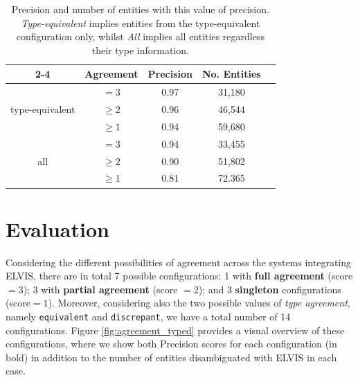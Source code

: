 \begin{table}[ht!]
\centering
\def\arraystretch{1.2}
	\begin{tabular}{| c | c | c | c | c |}
\cline{2-4}
\multicolumn{1}{ c |  }{} & \textbf{Agreement} & \textbf{Precision} & \textbf{No. Entities} \\
\hline
\multirow{3}{*}{type-equivalent} & $=3$ & 0.97 & 31,180\\
&$\geq2$ & 0.96 & 46,544 \\
&$\geq1$ & 0.94 & 59,680 \\
\hline
\multirow{3}{*}{all} & $=3$ & 0.94 & 33,455\\
&$\geq2$ & 0.90 & 51,802\\
&$\geq1$ & 0.81 & 72.365\\
\hline
	\end{tabular}
	\caption{Precision and number of entities with this value of precision. \textit{Type-equivalent} implies entities from the type-equivalent configuration only, whilst \textit{All} implies all entities regardless their type information.}
	\label{tbl:results}
\end{table}

\section{Evaluation}
\label{evaluation}



Considering the different possibilities of agreement across the systems integrating \textsc{ELVIS}, there are in total 7 possible configurations: 1 with \textbf{full agreement} (score$=3$); 3 with \textbf{partial agreement} (score $=2$); and 3 \textbf{singleton} configurations (score$=1$). Moreover, considering also the two possible values of \textit{type agreement}, namely \texttt{equivalent} and \texttt{discrepant}, we have a total number of 14 configurations. Figure \ref{fig:agreement_typed} provides a visual overview of these configurations, where we show both Precision scores for each configuration (in bold) in addition to the number of entities disambiguated with \textsc{ELVIS} in each case.


